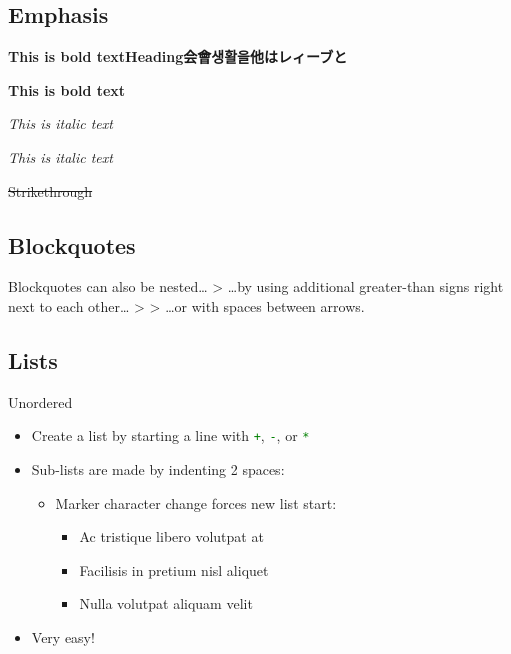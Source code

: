 \documentclass[
  paper=a4,
  ,captions=tableheading
]{scrartcl}
\renewcommand{\st}[1]{\sout{#1}}
\providecommand{\tightlist}{%
  \setlength{\itemsep}{0pt}\setlength{\parskip}{0pt}}
\renewenvironment{quote}{\begin{customblockquote}\list{}{\rightmargin=0em\leftmargin=0em}%
\item\relax\color{blockquote-text}\ignorespaces}{\unskip\unskip\endlist\end{customblockquote}}
\begin{document}
\hypertarget{emphasis}{%
\subsection{Emphasis}\label{emphasis}}

\textbf{This is bold textHeading会會생활을他はレィーブと}

\textbf{This is bold text}

\emph{This is italic text}

\emph{This is italic text}

\st{Strikethrough}

\hypertarget{blockquotes}{%
\subsection{Blockquotes}\label{blockquotes}}

\begin{quote}
Blockquotes can also be nested\ldots{} \textgreater{} \ldots by using
additional greater-than signs right next to each other\ldots{}
\textgreater{} \textgreater{} \ldots or with spaces between arrows.
\end{quote}

\hypertarget{lists}{%
\subsection{Lists}\label{lists}}

Unordered

\begin{itemize}
\tightlist
\item
  Create a list by starting a line with
  \textcolor{green}{\lstinline{+}}, \textcolor{green}{\lstinline{-}}, or
  \textcolor{green}{\lstinline{*}}
\item
  Sub-lists are made by indenting 2 spaces:

  \begin{itemize}
  \tightlist
  \item
    Marker character change forces new list start:

    \begin{itemize}
    \tightlist
    \item
      Ac tristique libero volutpat at
    \item
      Facilisis in pretium nisl aliquet
    \item
      Nulla volutpat aliquam velit
    \end{itemize}
  \end{itemize}
\item
  Very easy!
\end{itemize}
\end{document}
